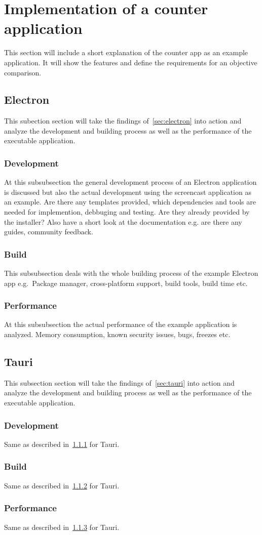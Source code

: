 \section{Implementation of a counter application}
\label{sec:implementation}
This section will include a short explanation of the counter app as an example application.
It will show the features and define the requirements for an objective comparison.

\subsection{Electron}
\label{subsec:impl:electron}
This subection section will take the findings of~\ref{sec:electron} into action and analyze the development and building process as well as the performance of the executable application.

\subsubsection{Development}
\label{subsubsec:impl:electron:dev}
At this subsubsection the general development process of an Electron application is discussed but also the actual development using the screencast
application as an example.
Are there any templates provided, which dependencies and tools are needed for implemention, debbuging and testing.
Are they already provided by the installer?
Also have a short look at the documentation e.g. are there any guides, community feedback.

\subsubsection{Build}
\label{subsubsec:impl:electron:build}
This subsubsection deals with the whole building process of the example Electron app e.g.\ Package manager, cross-platform support, build tools, build time etc.

\subsubsection{Performance}
\label{subsubsec:impl:electron:performance}
At this subsubsection the actual performance of the example application is analyzed.
Memory consumption, known security issues, bugs, freezes etc.

\subsection{Tauri}\label{subsec:impl:tauri}
This subsection section will take the findings of~\ref{sec:tauri} into action and analyze
the development and building process as well as the performance of the executable application.

\subsubsection{Development}
Same as described in~\ref{subsubsec:impl:electron:dev} for Tauri.
\subsubsection{Build}
Same as described in~\ref{subsubsec:impl:electron:build} for Tauri.
\subsubsection{Performance}
Same as described in~\ref{subsubsec:impl:electron:performance} for Tauri.